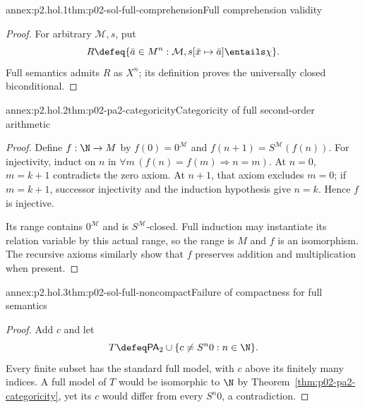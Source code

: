 
\begin{annexitem}{annex:p2.hol.1}{thm:p02-sol-full-comprehension}{Full comprehension validity}
\begin{proof}
For arbitrary \(\mathcal M,s\), put
\[
 R\defeq\{\bar a\in M^n:
   \mathcal M,s[\bar x\mapsto\bar a]\entails\chi\}.
\]
Full semantics admits \(R\) as \(X^n\); its definition proves the universally
closed biconditional.
\end{proof}
\end{annexitem}

\begin{annexitem}{annex:p2.hol.2}{thm:p02-pa2-categoricity}{Categoricity of full second-order arithmetic}
\begin{proof}
Define \(f:\N\to M\) by \(f(0)=0^{\mathcal M}\) and
\(f(n+1)=S^{\mathcal M}(f(n))\).  For injectivity, induct on \(n\) in
\(\forall m\,(f(n)=f(m)\Rightarrow n=m)\).  At \(n=0\), \(m=k+1\) contradicts
the zero axiom.  At \(n+1\), that axiom excludes \(m=0\); if \(m=k+1\),
successor injectivity and the induction hypothesis give \(n=k\).  Hence \(f\)
is injective.

Its range contains \(0^{\mathcal M}\) and is \(S^{\mathcal M}\)-closed.  Full
induction may instantiate its relation variable by this actual range, so the
range is \(M\) and \(f\) is an isomorphism.  The recursive axioms similarly
show that \(f\) preserves addition and multiplication when present.
\end{proof}
\end{annexitem}

\begin{annexitem}{annex:p2.hol.3}{thm:p02-sol-full-noncompact}{Failure of compactness for full semantics}
\begin{proof}
Add \(c\) and let
\[
 T\defeq\mathsf{PA}_2\cup\{c\ne S^n0:n\in\N\}.
\]
Every finite subset has the standard full model, with \(c\) above its finitely
many indices.  A full model of \(T\) would be isomorphic to \(\N\) by
Theorem~\ref{thm:p02-pa2-categoricity}, yet its \(c\) would differ from every
\(S^n0\), a contradiction.
\end{proof}
\end{annexitem}


